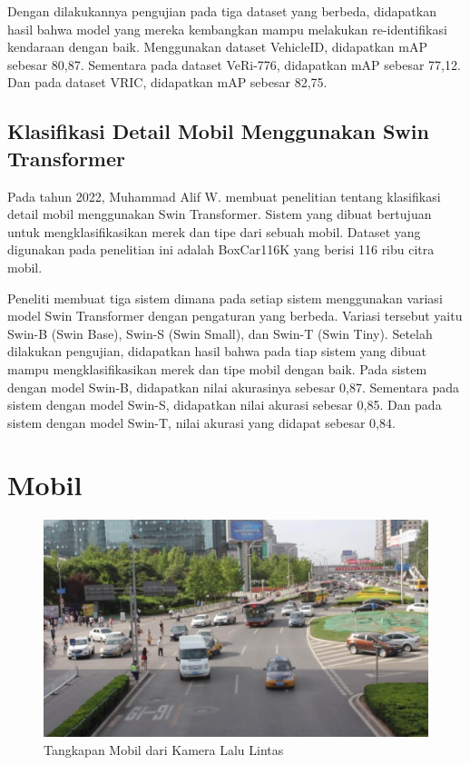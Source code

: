 Dengan dilakukannya pengujian pada tiga dataset yang berbeda, didapatkan hasil bahwa model yang mereka kembangkan 
mampu melakukan re-identifikasi kendaraan dengan baik. Menggunakan dataset VehicleID, didapatkan mAP sebesar 80,87. 
Sementara  pada dataset VeRi-776, didapatkan mAP sebesar 77,12. Dan pada dataset VRIC, didapatkan mAP sebesar 
82,75\parencite{Rong2021}.

\subsection{Klasifikasi Detail Mobil Menggunakan Swin Transformer}

Pada tahun 2022, Muhammad Alif W. membuat penelitian tentang klasifikasi detail mobil menggunakan Swin Transformer. 
Sistem yang dibuat bertujuan untuk mengklasifikasikan merek dan tipe dari sebuah mobil. Dataset yang digunakan 
pada penelitian ini adalah BoxCar116K yang berisi 116 ribu citra mobil.

Peneliti membuat tiga sistem dimana pada setiap sistem menggunakan variasi model Swin Transformer dengan pengaturan 
yang berbeda. Variasi tersebut yaitu Swin-B (Swin Base), Swin-S (Swin Small), dan Swin-T (Swin Tiny). Setelah 
dilakukan pengujian, didapatkan hasil bahwa pada tiap sistem yang dibuat mampu mengklasifikasikan merek dan tipe mobil 
dengan baik. Pada sistem dengan model Swin-B, didapatkan nilai akurasinya sebesar 0,87. Sementara pada sistem dengan 
model Swin-S, didapatkan nilai akurasi sebesar 0,85. Dan pada sistem dengan model Swin-T, nilai akurasi yang didapat 
sebesar 0,84\parencite{Wicaksono2022}.

\section{Mobil}
\label{sec:mobil}

\begin{figure}[ht]
  \centering
  \includegraphics[scale=0.35]{gambar/Mobil2.jpg}
  \caption{Tangkapan Mobil dari Kamera Lalu Lintas}
  \label{fig:tangkapanmobildarikameralalulintas}
\end{figure}

